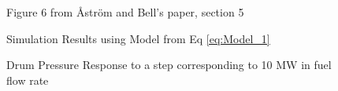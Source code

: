         \begin{figure}[ht]
            \begin{center}
                
                Figure 6 from \r{A}str\"{o}m and Bell's paper, section 5 \cite{Astrom}
                    
                
                Simulation Results using Model from Eq \eqref{eq:Model_1}
                
                \caption{Drum Pressure Response to a step corresponding to 10 MW in fuel flow rate}
                \label{fig:Fig6D}                
            \end{center}
        \end{figure}  %
